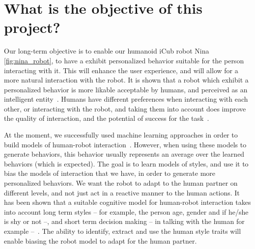 \section{What is the objective of this project?}
\par Our long-term objective is to enable our humanoid iCub robot Nina \ref{fig:nina_robot}, to have a exhibit personalized behavior suitable for the person interacting with it. This will enhance the user experience, and will allow for a more natural interaction with the robot. It is shown that a robot which exhibit a personalized behavior is more likable acceptable by humans, and perceived as an intelligent entity~\citep{churamani2017impact}. Humans have different preferences when interacting with each other, or interacting with the robot, and taking them into account does improve the quality of interaction, and the potential of success for the task~\citep{kashi2018smooth}.

\par At the moment, we successfully used machine learning approaches in order to build models of human-robot interaction~\citep{mihoub2016graphical,bailly:hal-01939223,nguyen:hal-01609535}. However, when using these models to generate behaviors, this behavior usually represents an average over the learned behaviors (which is expected). The goal is to learn models of styles, and use it to bias the models of interaction that we have, in order to generate more personalized behaviors. We want the robot to adapt to the human partner on different levels, and not just act in a reactive manner to the human actions. It has been shown that a suitable cognitive model for human-robot interaction takes into account long term styles -- for example, the person age, gender and if he/she is shy or not --, and short term decision making -- in talking with the human for example --~\citep{thorisson2002natural,bailly2010gaze}. The ability to identify, extract and use the human style traits will enable biasing the robot model to adapt for the human partner.


